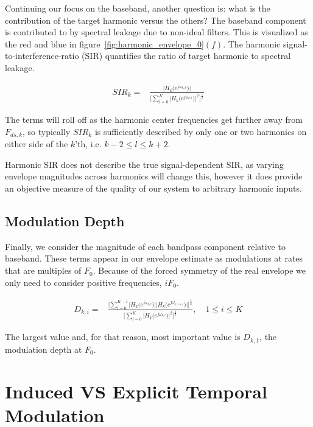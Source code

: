 \documentclass [11pt, proquest,oneside] {uwthesis}[2015/03/03]
\begin{document}
Continuing our focus on the baseband, another question is: what is the contribution of the target harmonic versus the others?  The baseband component is contributed to by spectral leakage due to non-ideal filters.  This is visualized as the red and blue in figure~\ref{fig:harmonic_envelope_0}$(f)$.  The harmonic signal-to-interference-ratio (SIR) quantifies the ratio of target harmonic to spectral leakage.

\begin{align}
SIR_k =& \frac{\Big| H_k\big(e^{j\omega_{k,k}}\big) \Big|} {\Bigg[ \sum\limits_{l=0}^K \Big|H_k\big(e^{j\omega_{k,l}}\big)\Big|^2 \Bigg] ^ \frac{1}{2}}
\end{align}

The terms will roll off as the harmonic center frequencies get further away from $F_{ds,k}$, so typically $SIR_k$ is sufficiently described by only one or two harmonics on either side of the $k$'th, i.e. $k-2 \leq l \leq k+2$.

Harmonic SIR does not describe the true signal-dependent SIR, as varying envelope magnitudes across harmonics will change this, however it does provide an objective measure of the quality of our system to arbitrary harmonic inputs.


\subsection{Modulation Depth}

Finally, we consider the magnitude of each bandpass component relative to baseband.  These terms appear in our envelope estimate as modulations at rates that are multiples of $F_0$.  Because of the forced symmetry of the real envelope we only need to consider positive frequencies, $iF_0$.

\begin{align}
D_{k,i} =& \frac{\Bigg[ \sum\limits_{l=0}^{K-i} \Big|H_k\big(e^{j\omega_{k,l}}\big)\Big| \Big|H_k\big(e^{j\omega_{k,l+i}}\big)\Big|\Bigg]^\frac{1}{2}}
{\Bigg[ \sum\limits_{l=0}^K \Big|H_k\big(e^{j\omega_{k,l}}\big)\Big|^2 \Bigg] ^ \frac{1}{2}}, \quad 1 \leq i \leq K
\end{align}

The largest value and, for that reason, most important value is $D_{k,1}$, the modulation depth at $F_0$.

\section{Induced VS Explicit Temporal Modulation}
\end{document}
